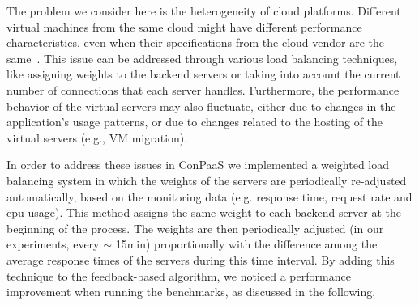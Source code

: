 
The problem we consider here is the heterogeneity of cloud platforms.
Different virtual machines from the same cloud might have different performance
characteristics, even when their specifications from the cloud vendor are 
the same~\cite{ec2Performance}. This issue can be addressed through various 
load balancing techniques, like assigning weights to the backend servers or 
taking into account the current number of connections that each server 
handles. Furthermore, the performance behavior of the virtual servers may 
also fluctuate, either due to changes in the application's usage 
patterns, or due to changes related to the hosting of the virtual servers 
(e.g., VM migration).

In order to address these issues in ConPaaS we implemented a weighted 
load balancing system in which the weights of the servers are 
periodically re-adjusted automatically, based on the monitoring data (e.g. response time, request rate and cpu usage).  
This method assigns the same weight to each backend server at the 
beginning of the process. The weights are then periodically
adjusted (in our experiments, every $\sim$ 15min) proportionally 
with the difference among the average response times of the servers 
during this time interval. By adding this technique to the feedback-based
algorithm, we noticed a performance improvement when running the
benchmarks, as discussed in the following.

